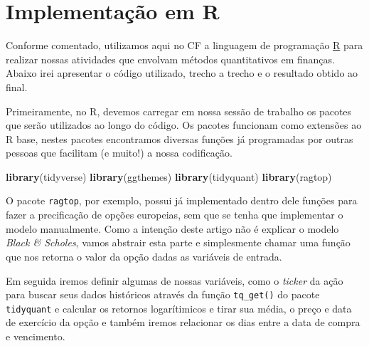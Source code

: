 \documentclass[]{book}
\newenvironment{Shaded}{\begin{snugshade}}{\end{snugshade}}
\newcommand{\KeywordTok}[1]{\textcolor[rgb]{0.13,0.29,0.53}{\textbf{#1}}}
\newcommand{\NormalTok}[1]{#1}
\theoremstyle{definition}
\theoremstyle{definition}
\theoremstyle{definition}
\theoremstyle{remark}
\begin{document}
\hypertarget{implementacao-em-r}{%
\section{Implementação em R}\label{implementacao-em-r}}

Conforme comentado, utilizamos aqui no CF a linguagem de programação \href{https://cran.r-project.org/}{R} para realizar nossas atividades que envolvam métodos quantitativos em finanças. Abaixo irei apresentar o código utilizado, trecho a trecho e o resultado obtido ao final.

Primeiramente, no R, devemos carregar em nossa sessão de trabalho os pacotes que serão utilizados ao longo do código. Os pacotes funcionam como extensões ao R base, nestes pacotes encontramos diversas funções já programadas por outras pessoas que facilitam (e muito!) a nossa codificação.

\begin{Shaded}
\begin{Highlighting}[]
\KeywordTok{library}\NormalTok{(tidyverse)}
\KeywordTok{library}\NormalTok{(ggthemes)}
\KeywordTok{library}\NormalTok{(tidyquant)}
\KeywordTok{library}\NormalTok{(ragtop)}
\end{Highlighting}
\end{Shaded}

O pacote \texttt{ragtop}, por exemplo, possui já implementado dentro dele funções para fazer a precificação de opções europeias, sem que se tenha que implementar o modelo manualmente. Como a intenção deste artigo não é explicar o modelo \emph{Black \& Scholes}, vamos abstrair esta parte e simplesmente chamar uma função que nos retorna o valor da opção dadas as variáveis de entrada.

Em seguida iremos definir algumas de nossas variáveis, como o \emph{ticker} da ação para buscar seus dados históricos através da função \texttt{tq\_get()} do pacote \texttt{tidyquant} e calcular os retornos logarítimicos e tirar sua média, o preço e data de exercício da opção e também iremos relacionar os dias entre a data de compra e vencimento.
\end{document}
